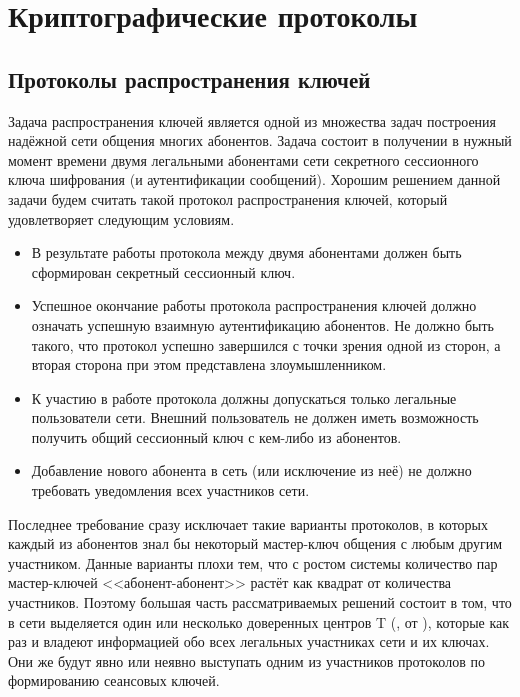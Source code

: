 \chapter{Криптографические протоколы}\label{chapter-protocols}







\section{Протоколы распространения ключей}

Задача распространения ключей является одной из множества задач построения надёжной сети общения многих абонентов. Задача состоит в получении в нужный момент времени двумя легальными абонентами сети секретного сессионного ключа шифрования (и аутентификации сообщений). Хорошим решением данной задачи будем считать такой протокол распространения ключей, который удовлетворяет следующим условиям.

\begin{itemize}
	\item В результате работы протокола между двумя абонентами должен быть сформирован секретный сессионный ключ.
	\item Успешное окончание работы протокола распространения ключей должно означать успешную взаимную аутентификацию абонентов. Не должно быть такого, что протокол успешно завершился с точки зрения одной из сторон, а вторая сторона при этом представлена злоумышленником.
	\item К участию в работе протокола должны допускаться только легальные пользователи сети. Внешний пользователь не должен иметь возможность получить общий сессионный ключ с кем-либо из абонентов.
	\item Добавление нового абонента в сеть (или исключение из неё) не должно требовать уведомления всех участников сети.
\end{itemize}

Последнее требование сразу исключает такие варианты протоколов, в которых каждый из абонентов знал бы некоторый мастер-ключ общения с любым другим участником. Данные варианты плохи тем, что с ростом системы количество пар мастер-ключей <<абонент-абонент>> растёт как квадрат от количества участников. Поэтому большая часть рассматриваемых решений состоит в том, что в сети выделяется один или несколько доверенных центров T (, от ), которые как раз и владеют информацией обо всех легальных участниках сети и их ключах. Они же будут явно или неявно выступать одним из участников протоколов по формированию сеансовых ключей.

